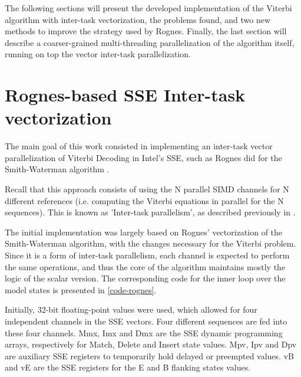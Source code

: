 The following sections will present the developed implementation of the Viterbi algorithm with inter-task vectorization, the problems found, and two new methods to improve the strategy used by Rognes. Finally, the last section will describe a coarser-grained multi-threading parallelization of the algorithm itself, running on top the vector inter-task parallelization.







\section{Rognes-based SSE Inter-task vectorization}
\label{Rognes-based SSE Inter-task vectorization}

The main goal of this work consisted in implementing an inter-task vector parallelization of Viterbi Decoding in Intel's SSE, such as Rognes did for the Smith-Waterman algorithm \cite{rognes2011}.

Recall that this approach consists of using the N parallel SIMD channels for N different references (i.e. computing the Viterbi equations in parallel for the N sequences). This is known as 'Inter-task parallelism', as described previously in . 

The initial implementation was largely based on Rognes' vectorization of the Smith-Waterman algorithm, with the changes necessary for the Viterbi problem. Since it is a form of inter-task parallelism, each channel is expected to perform the same operations, and thus the core of the algorithm maintains mostly the logic of the scalar version. The corresponding code  for the inner loop over the model states is presented in \cref{code-rognes}.

	
Initially, 32-bit floating-point values were used, which allowed for four independent channels in the SSE vectors. Four different sequences are fed into these four channels. Mmx, Imx and Dmx are the SSE dynamic programming arrays, respectively for Match, Delete and Insert state values. Mpv, Ipv and Dpv are auxiliary SSE registers to temporarily hold delayed or preempted values.
vB and vE are the SSE registers for the E and B flanking states values.

